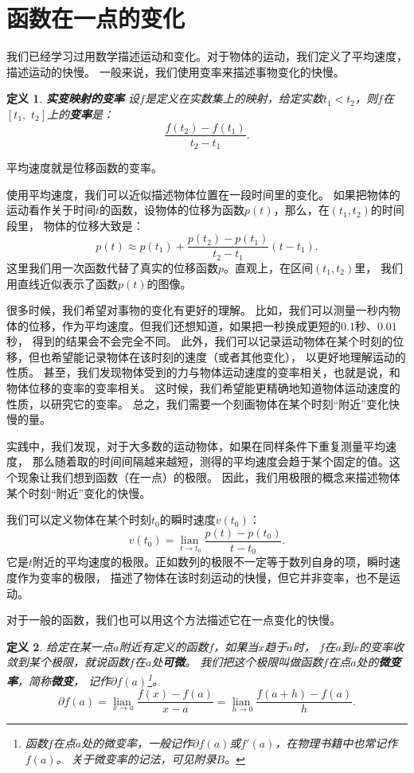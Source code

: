 \documentclass[12pt,UTF8]{ctexbook}
\newcommand{\lian}[1]{
    \underset{#1}{\operatorname{lian}\,}
}
\newtheorem{df}{定义}[section]
\begin{document}
\section{函数在一点的变化}
我们已经学习过用数学描述运动和变化。对于物体的运动，我们定义了平均速度，描述运动的快慢。
一般来说，我们使用变率来描述事物变化的快慢。
\begin{df}{\textbf{实变映射的变率}}
    设$f$是定义在实数集上的映射，给定实数$t_1 < t_2$，则$f$在$[t_1,\,\,t_2]$上的\textbf{变率}是：
    $$ \frac{f(t_2) - f(t_1)}{t_2 - t_1}.$$
\end{df}

平均速度就是位移函数的变率。

使用平均速度，我们可以近似描述物体位置在一段时间里的变化。
如果把物体的运动看作关于时间$t$的函数，设物体的位移为函数$p(t)$，那么，在$(t_1, t_2)$的时间段里，
物体的位移大致是：
$$ p(t) \approx p(t_1) + \frac{p(t_2) - p(t_1)}{t_2 - t_1}(t - t_1).$$
这里我们用一次函数代替了真实的位移函数$p$。直观上，在区间$(t_1, t_2)$里，
我们用直线近似表示了函数$p(t)$的图像。

很多时候，我们希望对事物的变化有更好的理解。
比如，我们可以测量一秒内物体的位移，作为平均速度。但我们还想知道，如果把一秒换成更短的$0.1$秒、$0.01$秒，
得到的结果会不会完全不同。
此外，我们可以记录运动物体在某个时刻的位移，但也希望能记录物体在该时刻的速度（或者其他变化），
以更好地理解运动的性质。
甚至，我们发现物体受到的力与物体运动速度的变率相关，也就是说，和物体位移的变率的变率相关。
这时候，我们希望能更精确地知道物体运动速度的性质，以研究它的变率。
总之，我们需要一个刻画物体在某个时刻“附近”变化快慢的量。

实践中，我们发现，对于大多数的运动物体，如果在同样条件下重复测量平均速度，
那么随着取的时间间隔越来越短，测得的平均速度会趋于某个固定的值。这个现象让我们想到函数（在一点）的极限。
因此，我们用极限的概念来描述物体某个时刻“附近”变化的快慢。

我们可以定义物体在某个时刻$t_0$的瞬时速度$v(t_0)$：
$$ v(t_0) = \lian{t\to t_0} \frac{p(t) - p(t_0)}{t - t_0}.$$
它是$t$附近的平均速度的极限。正如数列的极限不一定等于数列自身的项，瞬时速度作为变率的极限，
描述了物体在该时刻运动的快慢，但它并非变率，也不是运动。

对于一般的函数，我们也可以用这个方法描述它在一点变化的快慢。

\begin{df}\label{df:2-1-0}
给定在某一点$a$附近有定义的函数$f$，如果当$x$趋于$a$时，
$f$在$a$到$x$的变率收敛到某个极限，就说函数$f$在$a$处\textbf{可微}。
我们把这个极限叫做函数$f$在点$a$处的\textbf{微变率}，简称\textbf{微变}，
记作$\partial f(a)$\footnote{函数$f$在点$a$处的微变率，一般记作$\partial f(a)$或$f'(a)$，在物理书籍中也常记作$\dot{f}(a)$。
关于微变率的记法，可见附录$B$。}。
$$ \partial f(a) = \lian{x\to a} \frac{f(x) - f(a)}{x - a} = \lian{h\to 0} \frac{f(a + h) - f(a)}{h}.$$
\end{df}
\end{document}
